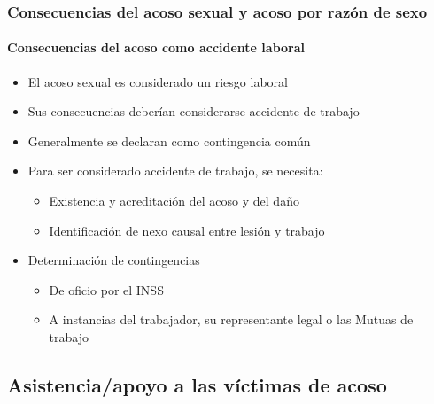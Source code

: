 \documentclass{beamer}
\newcommand{\highlight}[1]{{\color{Blue} #1}}
\begin{document}
    \begin{frame}
        \frametitle{Consecuencias del acoso sexual y acoso por razón de sexo}
        \framesubtitle{Consecuencias del acoso como accidente laboral}
        \begin{itemize}
            \item El acoso sexual es considerado un \highlight{riesgo laboral}
            \item Sus consecuencias deberían considerarse \highlight{accidente de trabajo}
            \item Generalmente se declaran como \highlight{contingencia común}
            \item Para ser considerado accidente de trabajo, se necesita:
            \begin{itemize}
                \item Existencia y acreditación del acoso y del daño
                \item Identificación de nexo causal entre lesión y trabajo
            \end{itemize}
            \item  Determinación de contingencias
            \begin{itemize}
                \item De oficio por el INSS
                \item A instancias del trabajador, su representante legal o las Mutuas de trabajo
            \end{itemize}
        \end{itemize}
    \end{frame}

    \subsection{Asistencia/apoyo a las víctimas de acoso}
\end{document}
